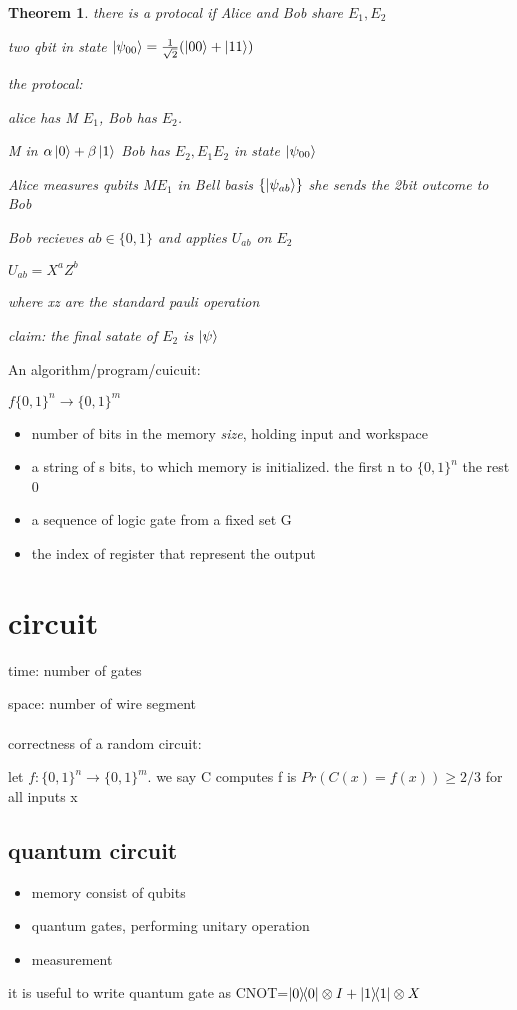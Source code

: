 \documentclass[10pt]{article}
\theoremstyle{break}
\newtheorem{thm}{Theorem}[subsection]
\begin{document}
\begin{thm}
    there is a protocal if Alice and Bob share $E_1, E_2$

    two qbit in state $\ket{\psi_{00}}=\frac{1}{\sqrt{2}}(\ket{00}+\ket{11})$


    the protocal:

    alice has M $E_1$, Bob has $E_2$.

    M in $\alpha\ket{0}+\beta\ket{1}$ Bob has $E_2, E_1E_2$ in state $\ket{\psi_{00}}$

    Alice measures qubits $ME_1$ in Bell basis $\{\ket{\psi_{ab}}\}$
    she sends the 2bit outcome to Bob

    Bob recieves $ab\in\{0,1\}$ and applies $U_{ab}$ on $E_2$

    $U_{ab}=X^aZ^b$

    where xz are the standard pauli operation

    claim: the final satate of $E_2$ is $\ket{\psi}$
\end{thm}

An algorithm/program/cuicuit:

$f\{0,1\}^n\rightarrow\{0,1\}^m$
\begin{itemize}
    \item number of bits in the memory \emph{size}, holding input and workspace
    \item a string of s bits, to which memory is initialized. the first n to $\{0,1\}^n$ the rest 0
    \item a sequence of logic gate from a fixed set G
    \item the index of register that represent the output
\end{itemize}

\section{circuit}
    time: number of gates 

    space: number of wire segment
    \\\\
    correctness of a random circuit:

    let $f:\{0,1\}^n \rightarrow \{0,1\}^m$. we say C computes f is $Pr(C(x)=f(x))\geq 2/3$
    for all inputs x

    \subsection{quantum circuit}
    \begin{itemize}
        \item memory consist of qubits 
        \item quantum gates, performing unitary operation 
        \item measurement
    \end{itemize} 
    it is useful to write quantum gate as CNOT=$\ketbra{0}{0}\otimes I+\ketbra{1}{1}\otimes X$
\end{document}
